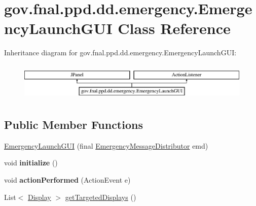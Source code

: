 \hypertarget{classgov_1_1fnal_1_1ppd_1_1dd_1_1emergency_1_1EmergencyLaunchGUI}{\section{gov.\-fnal.\-ppd.\-dd.\-emergency.\-Emergency\-Launch\-G\-U\-I Class Reference}
\label{classgov_1_1fnal_1_1ppd_1_1dd_1_1emergency_1_1EmergencyLaunchGUI}
}
Inheritance diagram for gov.\-fnal.\-ppd.\-dd.\-emergency.\-Emergency\-Launch\-G\-U\-I\-:\begin{figure}[H]
\begin{center}
\leavevmode
\includegraphics[height=1.830065cm]{classgov_1_1fnal_1_1ppd_1_1dd_1_1emergency_1_1EmergencyLaunchGUI}
\end{center}
\end{figure}
\subsection*{Public Member Functions}
\begin{DoxyCompactItemize}
\item 
\hyperlink{classgov_1_1fnal_1_1ppd_1_1dd_1_1emergency_1_1EmergencyLaunchGUI_ada7b11d41e8fde113dfaf0e483dc58d6}{Emergency\-Launch\-G\-U\-I} (final \hyperlink{interfacegov_1_1fnal_1_1ppd_1_1dd_1_1emergency_1_1EmergencyMessageDistributor}{Emergency\-Message\-Distributor} emd)
\item 
\hypertarget{classgov_1_1fnal_1_1ppd_1_1dd_1_1emergency_1_1EmergencyLaunchGUI_a37456dacf8b47f32406a1803e50a0615}{void {\bfseries initialize} ()}\label{classgov_1_1fnal_1_1ppd_1_1dd_1_1emergency_1_1EmergencyLaunchGUI_a37456dacf8b47f32406a1803e50a0615}

\item 
\hypertarget{classgov_1_1fnal_1_1ppd_1_1dd_1_1emergency_1_1EmergencyLaunchGUI_a95c444847473b12b1323b5c954e15e67}{void {\bfseries action\-Performed} (Action\-Event e)}\label{classgov_1_1fnal_1_1ppd_1_1dd_1_1emergency_1_1EmergencyLaunchGUI_a95c444847473b12b1323b5c954e15e67}

\item 
List$<$ \hyperlink{interfacegov_1_1fnal_1_1ppd_1_1dd_1_1signage_1_1Display}{Display} $>$ \hyperlink{classgov_1_1fnal_1_1ppd_1_1dd_1_1emergency_1_1EmergencyLaunchGUI_a1932baa3595f9d2fed1984a3a2a21c25}{get\-Targeted\-Displays} ()
\end{DoxyCompactItemize}
